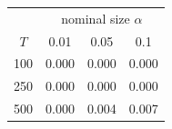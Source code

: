 % 
\begin{tabular}{cccc}
  \hline
  & \multicolumn{3}{c}{nominal size $\alpha$} \\
 $T$ & 0.01 & 0.05 & 0.1 \\
 \hline
100 & 0.000 & 0.000 & 0.000 \\ 
  250 & 0.000 & 0.000 & 0.000 \\ 
  500 & 0.000 & 0.004 & 0.007 \\ 
   \hline
\end{tabular}
